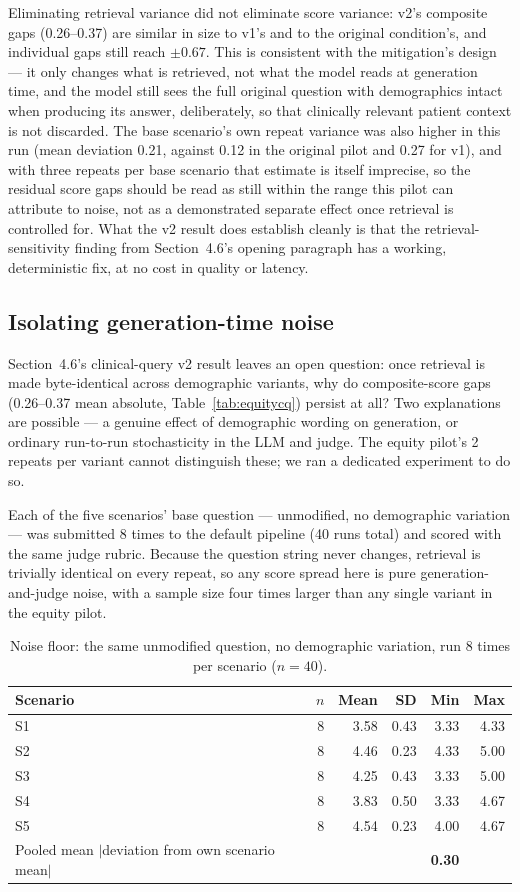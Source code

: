 \documentclass[11pt]{article}
\begin{document}
Eliminating retrieval variance did not eliminate score variance: v2's composite gaps (0.26--0.37) are similar in size to v1's and to the original condition's, and individual gaps still reach $\pm0.67$. This is consistent with the mitigation's design --- it only changes what is retrieved, not what the model reads at generation time, and the model still sees the full original question with demographics intact when producing its answer, deliberately, so that clinically relevant patient context is not discarded. The base scenario's own repeat variance was also higher in this run (mean deviation 0.21, against 0.12 in the original pilot and 0.27 for v1), and with three repeats per base scenario that estimate is itself imprecise, so the residual score gaps should be read as still within the range this pilot can attribute to noise, not as a demonstrated separate effect once retrieval is controlled for. What the v2 result does establish cleanly is that the retrieval-sensitivity finding from Section~4.6's opening paragraph has a working, deterministic fix, at no cost in quality or latency.
\subsection{Isolating generation-time noise}

Section~4.6's clinical-query v2 result leaves an open question: once retrieval is made byte-identical across demographic variants, why do composite-score gaps (0.26--0.37 mean absolute, Table~\ref{tab:equitycq}) persist at all? Two explanations are possible --- a genuine effect of demographic wording on generation, or ordinary run-to-run stochasticity in the LLM and judge. The equity pilot's 2 repeats per variant cannot distinguish these; we ran a dedicated experiment to do so.

Each of the five scenarios' base question --- unmodified, no demographic variation --- was submitted 8 times to the default pipeline (40 runs total) and scored with the same judge rubric. Because the question string never changes, retrieval is trivially identical on every repeat, so any score spread here is pure generation-and-judge noise, with a sample size four times larger than any single variant in the equity pilot.

\begin{table}[h]
\centering
\caption{Noise floor: the same unmodified question, no demographic variation, run 8 times per scenario ($n=40$).}
\label{tab:noisefloor}
\begin{tabular}{lrrrrr}
\toprule
Scenario & $n$ & Mean & SD & Min & Max \\
\midrule
S1 & 8 & 3.58 & 0.43 & 3.33 & 4.33 \\
S2 & 8 & 4.46 & 0.23 & 4.33 & 5.00 \\
S3 & 8 & 4.25 & 0.43 & 3.33 & 5.00 \\
S4 & 8 & 3.83 & 0.50 & 3.33 & 4.67 \\
S5 & 8 & 4.54 & 0.23 & 4.00 & 4.67 \\
\midrule
Pooled mean $|$deviation from own scenario mean$|$ & \multicolumn{4}{r}{\textbf{0.30}} \\
\bottomrule
\end{tabular}
\end{table}
\end{document}
